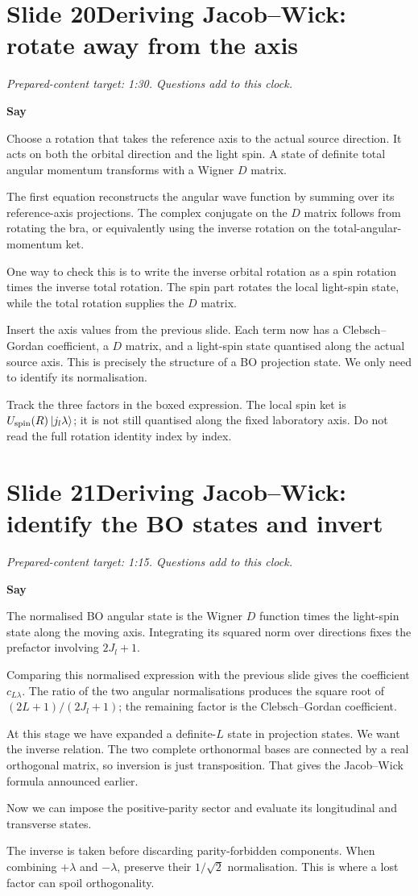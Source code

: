 \documentclass[11pt,a4paper]{article}
\newcommand{\cue}[1]{\begin{private}#1\end{private}}
\newenvironment{speech}{\par\textbf{Say}\par}{\par}
\newcommand{\slidenote}[3]{%
  \clearpage
  \pdfbookmark[1]{Slide #1}{slide-#1}%
  \section*{Slide #1\quad #2}
  \textit{Prepared-content target: #3. Questions add to this clock.}\par
}
\begin{document}
\slidenote{20}{Deriving Jacob--Wick: rotate away from the axis}{1:30}
\begin{speech}
Choose a rotation that takes the reference axis to the actual source
direction. It acts on both the orbital direction and the light spin.
A state of definite total angular momentum transforms with a Wigner
$D$ matrix.

The first equation reconstructs the angular wave function by summing
over its reference-axis projections. The complex conjugate on the
$D$ matrix follows from rotating the bra, or equivalently using the
inverse rotation on the total-angular-momentum ket.

One way to check this is to write the inverse orbital rotation as
a spin rotation times the inverse total rotation. The spin part
rotates the local light-spin state, while the total rotation supplies
the $D$ matrix.

Insert the axis values from the previous slide. Each term now has
a Clebsch--Gordan coefficient, a $D$ matrix, and a light-spin state
quantised along the actual source axis. This is precisely the structure
of a BO projection state. We only need to identify its normalisation.
\end{speech}
\cue{Track the three factors in the boxed expression. The local spin ket is
$U_{\rm spin}(R)\ket{j_l\lambda}$; it is not still quantised along the fixed
laboratory axis. Do not read the full rotation identity index by index.}

\slidenote{21}{Deriving Jacob--Wick: identify the BO states and invert}{1:15}
\begin{speech}
The normalised BO angular state is the Wigner $D$ function times the
light-spin state along the moving axis. Integrating its squared norm
over directions fixes the prefactor involving $2J_l+1$.

Comparing this normalised expression with the previous slide gives
the coefficient $c_{L\lambda}$. The ratio of the two angular
normalisations produces the square root of $(2L+1)/(2J_l+1)$;
the remaining factor is the Clebsch--Gordan coefficient.

At this stage we have expanded a definite-$L$ state in projection
states. We want the inverse relation. The two complete orthonormal
bases are connected by a real orthogonal matrix, so inversion is
just transposition. That gives the Jacob--Wick formula announced
earlier.

Now we can impose the positive-parity sector and evaluate its
longitudinal and transverse states.
\end{speech}
\cue{The inverse is taken before discarding parity-forbidden components.
When combining $+\lambda$ and $-\lambda$, preserve their $1/\sqrt2$
normalisation. This is where a lost factor can spoil orthogonality.}
\end{document}
